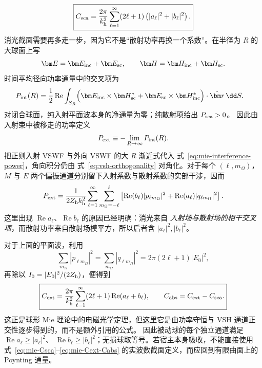 \begin{equation}
\boxed{
C_{\rm sca}
=\frac{2\pi}{k_{\rm h}^2}
\sum_{\ell=1}^{\infty}(2\ell+1)
\left(|a_\ell|^2+|b_\ell|^2\right).}
\label{eq:mie-Csca}
\end{equation}
消光截面需要再多走一步，因为它不是“散射功率再换一个系数”。在半径为 $R$ 的大球面上写
\[
 \bm E=\bm E_{\rm inc}+\bm E_{\rm sc},
 \qquad
 \bm H=\bm H_{\rm inc}+\bm H_{\rm sc}.
\]
时间平均径向功率通量中的交叉项为
\begin{align}
P_{\rm int}(R)
={}&\frac12\operatorname{Re}
\int_{S_R}
\Bigl(
 \bm E_{\rm inc}\times\bm H_{\rm sc}^{*}
 +\bm E_{\rm sc}\times\bm H_{\rm inc}^{*}
\Bigr)\cdot\hat{\bm r}\,\dd S .
\label{eq:mie-interference-power}
\end{align}
对闭合球面，纯入射平面波本身的净通量为零；纯散射项给出 $P_{\rm sca}>0$。
因此由入射束中被移走的功率定义
\begin{equation}
 P_{\rm ext}\equiv-\lim_{R\to\infty}P_{\rm int}(R).
 \label{eq:mie-extinction-power-definition}
\end{equation}
把正则入射 VSWF 与外向 VSWF 的大 $R$ 渐近式代入
式~\eqref{eq:mie-interference-power}，角向积分仍由
式~\eqref{eq:vsh-orthogonality} 对角化。对于每个
$(\ell,m_{\Omega})$，$M$ 与 $E$ 两个偏振通道分别留下入射系数与散射系数的实部干涉，因而
\begin{equation}
 P_{\rm ext}
 =\frac{1}{2Z_{\rm h}k_{\rm h}^{2}}
 \sum_{\ell=1}^{\infty}\sum_{m_{\Omega}=-\ell}^{\ell}
 \left[
 \operatorname{Re}(b_\ell)|p_{\ell m_{\Omega}}|^2
 +\operatorname{Re}(a_\ell)|q_{\ell m_{\Omega}}|^2
 \right].
 \label{eq:mie-arbitrary-beam-extinction-power}
\end{equation}
这里出现 $\operatorname{Re}a_\ell$、$\operatorname{Re}b_\ell$ 的原因已经明确：消光来自
\emph{入射场与散射场的相干交叉项}，而散射功率来自散射场模平方，所以后者含
$|a_\ell|^2,|b_\ell|^2$。

对于上面的平面波，利用
\[
 \sum_{m_{\Omega}}|p_{\ell m_{\Omega}}|^2
 =\sum_{m_{\Omega}}|q_{\ell m_{\Omega}}|^2
 =2\pi(2\ell+1)|E_0|^2,
\]
再除以 $I_0=|E_0|^2/(2Z_{\rm h})$，便得到
\begin{equation}
\boxed{
C_{\rm ext}
=\frac{2\pi}{k_{\rm h}^2}
\sum_{\ell=1}^{\infty}(2\ell+1)
\operatorname{Re}(a_\ell+b_\ell),
\qquad
C_{\rm abs}=C_{\rm ext}-C_{\rm sca}.}
\label{eq:mie-Cext-Cabs}
\end{equation}
这正是球形 Mie 理论中的电磁光学定理，但这里它是由功率守恒与 VSH 通道正交性逐步得到的，而不是额外引用的公式。
因此被动球的每个独立通道满足
$\operatorname{Re}a_\ell\ge|a_\ell|^2$、
$\operatorname{Re}b_\ell\ge|b_\ell|^2$；无损球取等号。若宿主本身吸收，不能直接使用式~\eqref{eq:mie-Csca}--\eqref{eq:mie-Cext-Cabs} 的实波数截面定义，而应回到有限曲面上的 Poynting 通量。


